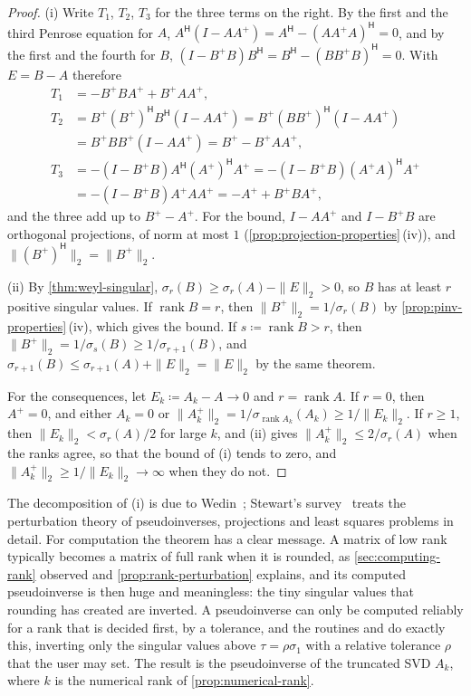 \begin{proof}
(i) Write $T_1$, $T_2$, $T_3$ for the three terms on the right. By the first and the third Penrose equation for $A$, $A^{\mathsf H}(I-AA^+)=A^{\mathsf H}-(AA^+A)^{\mathsf H}=0$, and by the first and the fourth for $B$, $(I-B^+B)B^{\mathsf H}=B^{\mathsf H}-(BB^+B)^{\mathsf H}=0$. With $E=B-A$ therefore
\begin{align*}
T_1&=-B^+BA^++B^+AA^+,\\
T_2&=B^+(B^+)^{\mathsf H}B^{\mathsf H}(I-AA^+)=B^+(BB^+)^{\mathsf H}(I-AA^+)\\
&=B^+BB^+(I-AA^+)=B^+-B^+AA^+,\\
T_3&=-(I-B^+B)A^{\mathsf H}(A^+)^{\mathsf H}A^+=-(I-B^+B)(A^+A)^{\mathsf H}A^+\\
&=-(I-B^+B)A^+AA^+=-A^++B^+BA^+,
\end{align*}
and the three add up to $B^+-A^+$. For the bound, $I-AA^+$ and $I-B^+B$ are orthogonal projections, of norm at most $1$ (\cref{prop:projection-properties}\,(iv)), and $\|(B^+)^{\mathsf H}\|_2=\|B^+\|_2$.

(ii) By \cref{thm:weyl-singular}, $\sigma_r(B)\ge\sigma_r(A)-\|E\|_2>0$, so $B$ has at least $r$ positive singular values. If $\operatorname{rank}B=r$, then $\|B^+\|_2=1/\sigma_r(B)$ by \cref{prop:pinv-properties}\,(iv), which gives the bound. If $s\coloneqq\operatorname{rank}B>r$, then $\|B^+\|_2=1/\sigma_s(B)\ge1/\sigma_{r+1}(B)$, and $\sigma_{r+1}(B)\le\sigma_{r+1}(A)+\|E\|_2=\|E\|_2$ by the same theorem.

For the consequences, let $E_k\coloneqq A_k-A\to0$ and $r=\operatorname{rank}A$. If $r=0$, then $A^+=0$, and either $A_k=0$ or $\|A_k^+\|_2=1/\sigma_{\operatorname{rank}A_k}(A_k)\ge1/\|E_k\|_2$. If $r\ge1$, then $\|E_k\|_2<\sigma_r(A)/2$ for large $k$, and (ii) gives $\|A_k^+\|_2\le2/\sigma_r(A)$ when the ranks agree, so that the bound of (i) tends to zero, and $\|A_k^+\|_2\ge1/\|E_k\|_2\to\infty$ when they do not.
\end{proof}

The decomposition of (i) is due to Wedin~\cite{wedin1973}; Stewart's survey~\cite{stewart1977} treats the perturbation theory of pseudoinverses, projections and least squares problems in detail. For computation the theorem has a clear message. A matrix of low rank typically becomes a matrix of full rank when it is rounded, as \cref{sec:computing-rank} observed and \cref{prop:rank-perturbation} explains, and its computed pseudoinverse is then huge and meaningless: the tiny singular values that rounding has created are inverted. A pseudoinverse can only be computed reliably for a rank that is decided first, by a tolerance, and the routines  and  do exactly this, inverting only the singular values above $\tau=\rho\sigma_1$ with a relative tolerance $\rho$ that the user may set. The result is the pseudoinverse of the truncated SVD $A_k$, where $k$ is the numerical rank of \cref{prop:numerical-rank}.

